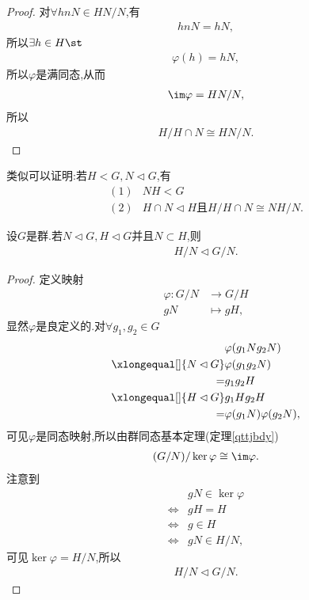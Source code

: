 \begin{proof}
    对$\forall hnN\in HN/N$,有\begin{align*}
        hnN=hN,
    \end{align*}所以$\exists h\in H\st$\begin{align*}
        \varphi(h)=hN,
    \end{align*}所以$\varphi$是满同态,从而\begin{align*}
        \im\varphi=HN/N,
    \end{align*}所以\begin{align*}
        H/H\cap N\cong HN/N.
    \end{align*}
\end{proof}
\begin{remark}
    类似可以证明:若$H<G,N\lhd G$,有\begin{align*}
        (1)&NH<G\\
        (2)&H\cap N\lhd H\text{且}H/H\cap N\cong NH/N.
    \end{align*}
\end{remark}
\begin{proposition}\label{sdajfan}
    设$G$是群.若$N\lhd G,H\lhd G$并且$N\subset H$,则\begin{align*}
        H/N\lhd G/N.
    \end{align*}
\end{proposition}
\begin{proof}
    定义映射\begin{align*}
        \varphi:G/N&\to G/H\\
        gN&\mapsto gH,
    \end{align*}显然$\varphi$是良定义的.对$\forall g_1,g_2\in G$\begin{align*}
        &\varphi(g_1Ng_2N)\\
        \xlongequal[]{N\lhd G}&\varphi(g_1g_2N)\\
        =&g_1g_2H\\
        \xlongequal[]{H\lhd G}&g_1Hg_2H\\
        =&\varphi(g_1N)\varphi(g_2N),
    \end{align*}可见$\varphi$是同态映射,所以由群同态基本定理(定理\ref{qttjbdy})\begin{align*}
        (G/N)/\ker\varphi\cong\im\varphi.
    \end{align*}注意到\begin{align*}
        &gN\in\ker\varphi\\
        \iff&gH=H\\
        \iff&g\in H\\
        \iff&gN\in H/N,
    \end{align*}可见$\ker\varphi=H/N$,所以\begin{align*}
        H/N\lhd G/N.
    \end{align*}
\end{proof}
